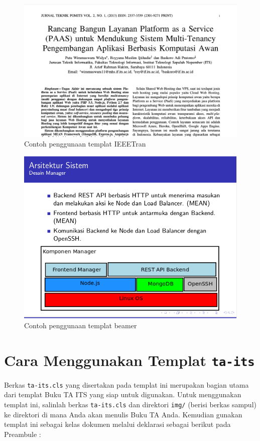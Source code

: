 \documentclass{ta-scientics-matematika-its}
\begin{document}
        \begin{figure}[h]
        	\centering
        	\includegraphics[width=\linewidth]{contoh_img/IEEETran}
        	\caption{Contoh penggunaan templat IEEETran}
        	\label{gambarIEEEtran}
        \end{figure}

        \begin{figure}[h]
        	\centering
        	\includegraphics[width=\linewidth]{contoh_img/beamer}
        	\caption{Contoh penggunaan templat beamer}
        	\label{gambarBeamer}
        \end{figure}

        \section{Cara Menggunakan Templat \texttt{ta-its}}
        Berkas \texttt{ta-its.cls} yang disertakan pada templat ini merupakan bagian utama dari templat Buku TA ITS yang siap untuk digunakan. Untuk menggunakan templat ini, salinlah berkas \texttt{ta-its.cls} dan direktori \texttt{img/} (berisi berkas sampul) ke direktori di mana Anda akan menulis Buku TA Anda. Kemudian gunakan templat ini sebagai kelas dokumen melalui deklarasi sebagai berikut pada Preambule :
\end{document}
